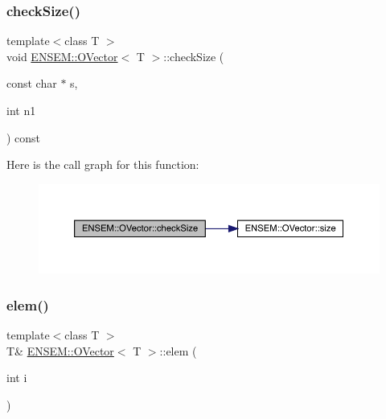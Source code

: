 \subsubsection{\texorpdfstring{checkSize()}{checkSize()}\hspace{0.1cm}{\footnotesize\ttfamily [6/6]}}
{\footnotesize\ttfamily template$<$class T $>$ \\
void \mbox{\hyperlink{classENSEM_1_1OVector}{E\+N\+S\+E\+M\+::\+O\+Vector}}$<$ T $>$\+::check\+Size (\begin{DoxyParamCaption}\item[{const char $\ast$}]{s,  }\item[{int}]{n1 }\end{DoxyParamCaption}) const\hspace{0.3cm}{\ttfamily [inline]}}

Here is the call graph for this function\+:
\nopagebreak
\begin{figure}[H]
\begin{center}
\leavevmode
\includegraphics[width=350pt]{d0/d8d/classENSEM_1_1OVector_a1446ad09778db3a287fb5f6fec304b22_cgraph}
\end{center}
\end{figure}
\mbox{\label{classENSEM_1_1OVector_a8d84b5c1145d0647107413d254450417}} 
\subsubsection{\texorpdfstring{elem()}{elem()}\hspace{0.1cm}{\footnotesize\ttfamily [1/6]}}
{\footnotesize\ttfamily template$<$class T $>$ \\
T\& \mbox{\hyperlink{classENSEM_1_1OVector}{E\+N\+S\+E\+M\+::\+O\+Vector}}$<$ T $>$\+::elem (\begin{DoxyParamCaption}\item[{int}]{i }\end{DoxyParamCaption})\hspace{0.3cm}{\ttfamily [inline]}}


